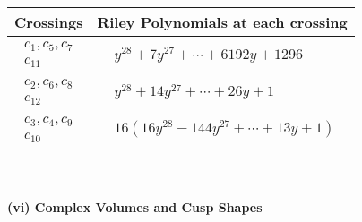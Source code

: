 \documentclass[1p]{elsarticle_modified}
\theoremstyle{definition}
\begin{document}
\begin{tabular}{m{50pt}|m{274pt}}
Crossings & \hspace{64pt}Riley Polynomials at each crossing \\
\hline $$\begin{aligned}c_{1},c_{5},c_{7}\\c_{11}\end{aligned}$$&$\begin{aligned}
&y^{28}+7 y^{27}+\cdots+6192 y+1296
\end{aligned}$\\
\hline $$\begin{aligned}c_{2},c_{6},c_{8}\\c_{12}\end{aligned}$$&$\begin{aligned}
&y^{28}+14 y^{27}+\cdots+26 y+1
\end{aligned}$\\
\hline $$\begin{aligned}c_{3},c_{4},c_{9}\\c_{10}\end{aligned}$$&$\begin{aligned}
&16(16 y^{28}-144 y^{27}+\cdots+13 y+1)
\end{aligned}$\\
\hline
\end{tabular}\\~\\
\newpage\flushleft \textbf{(vi) Complex Volumes and Cusp Shapes}
\end{document}
